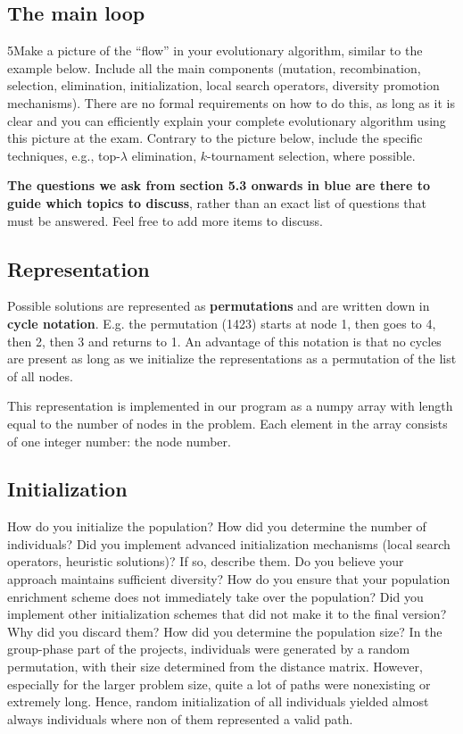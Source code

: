 \documentclass[a4paper,10pt]{article}
\newcommand{\ReplaceMe}[1]{{\color{blue}#1}}
\newcommand{\RemoveMe}[1]{{\color{purple}#1}}
\begin{document}
\subsection{The main loop}

5\ReplaceMe{Make a picture of the ``flow'' in your evolutionary algorithm, similar to the example below. Include all the main components (mutation, recombination, selection, elimination, initialization, local search operators, diversity promotion mechanisms). There are no formal requirements on how to do this, as long as it is clear and you can efficiently explain your complete evolutionary algorithm using this picture at the exam. Contrary to the picture below, include the specific techniques, e.g., top-$\lambda$ elimination, $k$-tournament selection, where possible.}


%

\clearpage
\RemoveMe{\textbf{The questions we ask from section 5.3 onwards in blue are there to guide which topics to discuss}, rather than an exact list of questions that must be answered. Feel free to add more items to discuss.}


\subsection{Representation}
Possible solutions are represented as \textbf{permutations} and are written down in \textbf{cycle notation}. E.g. the permutation (1423) starts at node 1, then goes to 4, then 2, then 3 and returns to 1. An advantage of this notation is that no cycles are present as long as we initialize the representations as a permutation of the list of all nodes. 

This representation is implemented in our program as a numpy array with length equal to the number of nodes in the problem. Each element in the array consists of one integer number: the node number.

\subsection{Initialization}
\label{initialization}
\ReplaceMe{How do you initialize the population? How did you determine the number of individuals? Did you implement advanced initialization mechanisms (local search operators, heuristic solutions)? If so, describe them. Do you believe your approach maintains sufficient diversity? How do you ensure that your population enrichment scheme does not immediately take over the population? Did you implement other initialization schemes that did not make it to the final version? Why did you discard them? How did you determine the population size?}
In the group-phase part of the projects, individuals were generated by a random permutation, with their size determined from the distance matrix. However, especially for the larger problem size, quite a lot of paths were nonexisting or extremely long. Hence, random initialization of all individuals yielded almost always individuals where non of them represented a valid path. 
\end{document}
